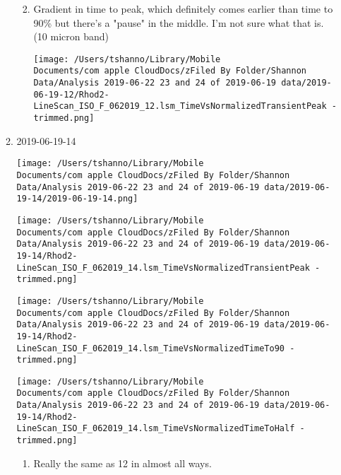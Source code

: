 \documentclass[11pt]{article}
\begin{document}
\begin{enumerate}
\begin{enumerate}
\begin{enumerate}
\begin{center}
\end{center}
\item Gradient in time to peak, which definitely comes earlier than time to 90\% but there's a "pause" in the middle.  I'm not sure what that is. (10 micron band)
\label{sec:org9aad718}
\begin{center}
\texttt{[image: /Users/tshanno/Library/Mobile Documents/com~apple~CloudDocs/zFiled By Folder/Shannon Data/Analysis 2019-06-22 23 and 24 of 2019-06-19 data/2019-06-19-12/Rhod2-LineScan\_ISO\_F\_062019\_12.lsm\_TimeVsNormalizedTransientPeak - trimmed.png]}
\end{center}
\end{enumerate}
\item 2019-06-19-14
\label{sec:orge663116}
\begin{center}
\texttt{[image: /Users/tshanno/Library/Mobile Documents/com~apple~CloudDocs/zFiled By Folder/Shannon Data/Analysis 2019-06-22 23 and 24 of 2019-06-19 data/2019-06-19-14/2019-06-19-14.png]}
\end{center}
\begin{center}
\texttt{[image: /Users/tshanno/Library/Mobile Documents/com~apple~CloudDocs/zFiled By Folder/Shannon Data/Analysis 2019-06-22 23 and 24 of 2019-06-19 data/2019-06-19-14/Rhod2-LineScan\_ISO\_F\_062019\_14.lsm\_TimeVsNormalizedTransientPeak - trimmed.png]}
\end{center}
\begin{center}
\texttt{[image: /Users/tshanno/Library/Mobile Documents/com~apple~CloudDocs/zFiled By Folder/Shannon Data/Analysis 2019-06-22 23 and 24 of 2019-06-19 data/2019-06-19-14/Rhod2-LineScan\_ISO\_F\_062019\_14.lsm\_TimeVsNormalizedTimeTo90 - trimmed.png]}
\end{center}
\begin{center}
\texttt{[image: /Users/tshanno/Library/Mobile Documents/com~apple~CloudDocs/zFiled By Folder/Shannon Data/Analysis 2019-06-22 23 and 24 of 2019-06-19 data/2019-06-19-14/Rhod2-LineScan\_ISO\_F\_062019\_14.lsm\_TimeVsNormalizedTimeToHalf - trimmed.png]}
\end{center}
\begin{enumerate}
\item Really the same as 12 in almost all ways.
\label{sec:orgee853d8}
\end{enumerate}


\end{enumerate}
\end{enumerate}
\end{document}
